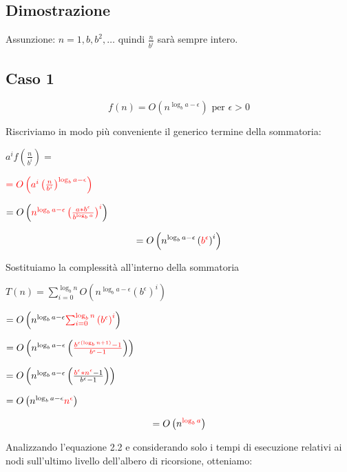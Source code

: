 \subsection{Dimostrazione}

Assunzione: $n = 1, b,b^2,\ldots$ quindi $\frac{n}{b^i}$ sarà sempre intero.

\subsection{Caso 1}

\begin{equation}
f(n) = O(n^{\log_b{a} - \epsilon}) \mbox{ per } \epsilon > 0
\end{equation}

Riscriviamo in modo più conveniente il generico termine della sommatoria:

$a^if\left(\frac{n}{b^i}\right)=$

$\textcolor{red}{=O\left(a^i\left(\frac{n}{b^i}\right)^{\log_b{a-\epsilon}}\right)}$

$= O\left(\textcolor{red}{n^{\log_b{a-\epsilon}}\left(\frac{a*b^\epsilon}{b^{\log_b{a}}}\right)^i}\right)$

\begin{equation}
= O\left(n^{\log_b{a-\epsilon}}\left(\textcolor{red}{b^\epsilon}\right)^i\right)
\end{equation}

Sostituiamo la complessità all'interno della sommatoria

$T(n) = \sum_{i=0}^{\log_b{n}}{O\left(n^{\log_b{a-\epsilon}}\left(b^\epsilon\right)^i\right)}$

$=O\left(n^{\log_b{a-\epsilon}}\textcolor{red}{\sum_{i=0}^{\log_b{n}}{(b^\epsilon)}^i}\right)$

$=O\left(n^{\log_b{a-\epsilon}}\left(\textcolor{red}{\frac{b^{\epsilon( \log_b{n}+1)}-1}{b^\epsilon-1}}\right)\right)$

$=O\left(n^{\log_b{a-\epsilon}}\left(\frac{\textcolor{red}{b^\epsilon * n^\epsilon} - 1}{b^\epsilon-1}\right)\right)$

$=O\left(n^{\log_b{a-\epsilon}}\textcolor{red}{n^\epsilon}\right)$

\begin{equation}
= O\left(n^{\textcolor{red}{\log_b{a}}}\right)
\end{equation}

Analizzando l’equazione 2.2 e considerando solo i tempi di esecuzione relativi ai nodi sull’ultimo livello dell’albero di ricorsione, otteniamo:

